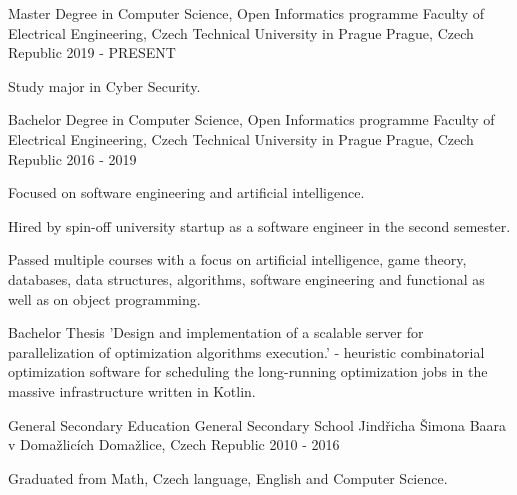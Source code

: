 
\begin{cventries}
	\cventry
	{Master Degree in Computer Science, Open Informatics programme}
	{Faculty of Electrical Engineering, Czech Technical University in Prague}
	{Prague, Czech Republic}
	{2019 - PRESENT}
	{
		\begin{cvitems}
			\item {Study major in Cyber Security.}
		\end{cvitems}
	}

	\cventry
	{Bachelor Degree in Computer Science, Open Informatics programme}
	{Faculty of Electrical Engineering, Czech Technical University in Prague}
	{Prague, Czech Republic}
	{2016 - 2019}
	{
		\begin{cvitems}
			\item {Focused on software engineering and artificial intelligence.}
			\item {Hired by spin-off university startup as a software engineer in the second semester.}
			\item {Passed multiple courses with a focus on artificial intelligence, game theory, databases,
			data structures, algorithms, software engineering and functional as well as on object programming.}
			 \item {Bachelor Thesis 'Design and implementation of a scalable server for parallelization of optimization algorithms execution.'
             - heuristic combinatorial optimization software for scheduling the long-running optimization jobs in the massive infrastructure written in Kotlin.}
		\end{cvitems}
	}

	\cventry
	{General Secondary Education}
	{General Secondary School Jindřicha Šimona Baara v Domažlicích}
	{Domažlice, Czech Republic}
	{2010 - 2016}
	{
		\begin{cvitems}
			\item {Graduated from Math, Czech language, English and Computer Science.}
		\end{cvitems}
	}

\end{cventries}